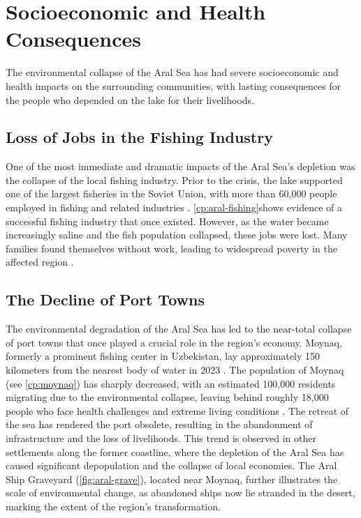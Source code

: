 

\chapter[Socioeconomic and Health Consequences]{Socioeconomic and Health Consequences}
\label{cp:consequences}

\vspace{.935em}

The environmental collapse of the Aral Sea has had severe socioeconomic and health impacts on the surrounding communities, with lasting consequences for the people who depended on the lake for their livelihoods. 

\section{Loss of Jobs in the Fishing Industry}
One of the most immediate and dramatic impacts of the Aral Sea's depletion was the collapse of the local fishing industry. Prior to the crisis, the lake supported one of the largest fisheries in the Soviet Union, with more than 60,000 people employed in fishing and related industries \autocite{plotnikov_fauna}. \autoref{cp:aral-fishing}shows evidence of a successful fishing industry that once existed. However, as the water became increasingly saline and the fish population collapsed, these jobs were lost. Many families found themselves without work, leading to widespread poverty in the affected region \autocite{micklin1988desiccation}. 

\section{The Decline of Port Towns}
The environmental degradation of the Aral Sea has led to the near-total collapse of port towns that once played a crucial role in the region's economy. Moynaq, formerly a prominent fishing center in Uzbekistan, lay approximately 150 kilometers from the nearest body of water in 2023 \autocite{bardsley2023toxic}. The population of Moynaq (see \autoref{cp:moynaq}) has sharply decreased, with an estimated 100,000 residents migrating due to the environmental collapse, leaving behind roughly 18,000 people who face health challenges and extreme living conditions \autocite{mannaerts2022port}. The retreat of the sea has rendered the port obsolete, resulting in the abandonment of infrastructure and the loss of livelihoods. This trend is observed in other settlements along the former coastline, where the depletion of the Aral Sea has caused significant depopulation and the collapse of local economies. The Aral Ship Graveyard (\autoref{fig:aral-grave}), located near Moynaq, further illustrates the scale of environmental change, as abandoned ships now lie stranded in the desert, marking the extent of the region’s transformation.


